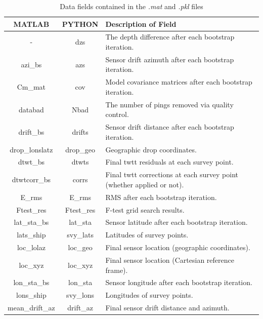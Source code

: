 \documentclass[titlepage, 12pt]{article}
\begin{document}
  \begin{table}[!htb]
   \centering
   \caption{Data fields contained in the \textit{.mat} and \textit{.pkl} files}
   \label{table:dict}
   \begin{tabularx}{\linewidth}{|c|c|X|}
    \hline
    \textbf{MATLAB} & \textbf{PYTHON} & \textbf{Description of Field} \\ \hline
    -               & dzs        & The depth difference after each bootstrap iteration. \\ \hline
    azi\_bs         & azs        & Sensor drift azimuth after each bootstrap iteration. \\ \hline
    Cm\_mat         & cov        & Model covariance matrices after each bootstrap iteration. \\ \hline
    databad         & Nbad       & The number of pings removed via quality control. \\ \hline
    drift\_bs       & drifts     & Sensor drift distance after each bootstrap iteration. \\ \hline
    drop\_lonslatz  & drop\_geo  & Geographic drop coordinates. \\ \hline
    dtwt\_bs        & dtwts      & Final twtt residuals at each survey point. \\ \hline
    dtwtcorr\_bs    & corrs      & Final twtt corrections at each survey point (whether applied or not). \\ \hline
    E\_rms          & E\_rms     & RMS after each bootstrap iteration. \\ \hline
    Ftest\_res      & Ftest\_res & F-test grid search results. \\ \hline
    lat\_sta\_bs    & lat\_sta   & Sensor latitude after each bootstrap iteration. \\ \hline
    lats\_ship      & svy\_lats  & Latitudes of survey points. \\ \hline
    loc\_lolaz      & loc\_geo   & Final sensor location (geographic coordinates). \\ \hline
    loc\_xyz        & loc\_xyz   & Final sensor location (Cartesian reference frame). \\ \hline
    lon\_sta\_bs    & lon\_sta   & Sensor longitude after each bootstrap iteration. \\ \hline
    lons\_ship      & svy\_lons  & Longitudes of survey points. \\ \hline
    mean\_drift\_az & drift\_az  & Final sensor drift distance and azimuth. \\ \hline

\end{tabularx}
\end{table}
\end{document}
